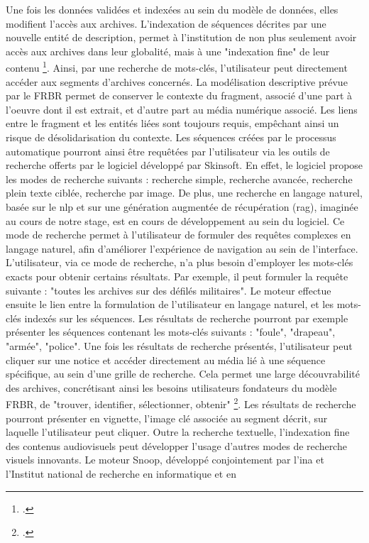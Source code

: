 Une fois les données validées et indexées au sein du modèle de données, elles modifient l'accès aux archives. L'indexation de séquences décrites par une nouvelle entité de description, permet à  l'institution de non plus seulement avoir accès aux archives dans leur globalité, mais à une "indexation fine" de leur contenu \footcite{bachimont2007}. Ainsi, par une recherche de mots-clés, l'utilisateur peut directement accéder aux segments d’archives concernés. La modélisation descriptive prévue par le FRBR permet de conserver le contexte du fragment, associé d'une part à l'oeuvre dont il est extrait, et d'autre part au média numérique associé. Les liens entre le fragment et les entités liées sont toujours requis, empêchant ainsi un risque de désolidarisation du contexte. 
Les séquences créées par le processus automatique pourront ainsi être requêtées par l'utilisateur via les outils de recherche offerts par le logiciel développé par Skinsoft. En effet, le logiciel propose les modes de recherche suivants : recherche simple, recherche avancée, recherche plein texte ciblée, recherche par image. De plus, une recherche en langage naturel, basée sur le \gls{nlp} et sur une génération augmentée de récupération (\gls{rag}), imaginée au cours de notre stage, est en cours de développement au sein du logiciel.  
Ce mode de recherche permet à l'utilisateur de formuler des requêtes complexes en langage naturel, afin d'améliorer l'expérience de navigation au sein de l'interface. L'utilisateur, via ce mode de recherche, n'a plus besoin d'employer les mots-clés exacts pour obtenir certains résultats. Par exemple, il peut formuler la requête suivante : "toutes les archives sur des défilés militaires". Le moteur effectue ensuite le lien entre la formulation de l'utilisateur en langage naturel, et les mots-clés indexés sur les séquences. Les résultats de recherche pourront par exemple présenter les séquences contenant les mots-clés suivants : "foule", "drapeau", "armée", "police". Une fois les résultats de recherche présentés, l'utilisateur peut cliquer sur une notice et accéder directement au média lié à une séquence spécifique, au sein d'une grille de recherche. Cela permet une large découvrabilité des archives, concrétisant ainsi les besoins utilisateurs fondateurs du modèle FRBR, de "trouver, identifier, sélectionner, obtenir" \footcite{zotero-item-653}. 
Les résultats de recherche pourront présenter en vignette, l’image clé associée au segment décrit, sur laquelle l’utilisateur peut cliquer. 
Outre la recherche textuelle, l'indexation fine des contenus audiovisuels peut développer l'usage d'autres modes de recherche visuels innovants. Le moteur Snoop, développé conjointement par l'\gls{ina} et l'Institut national de recherche en informatique et en
